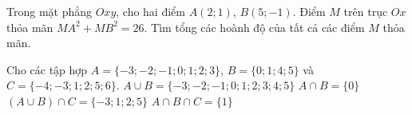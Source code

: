 \begin{bt}%
Trong mặt phẳng $Oxy$, cho hai điểm $A(2;1)$, $B(5;-1)$. Điểm $M$ trên trục $Ox$ thỏa mãn $MA^2+MB^2=26$. Tìm tổng các hoành độ của tất cả các điểm $M$ thỏa mãn.

\end{bt}

\begin{ex}%
	Cho các tập hợp $A=\{-3;-2;-1; 0; 1; 2;  3\}$, $B=\{0; 1; 4; 5\}$ và $C=\{-4;-3; 1; 2; 5; 6\}$.
	 \choiceTF
		 {\True $A\cup B=\{-3;-2;-1; 0; 1; 2; 3; 4; 5\}$}
		{$A\cap  B=\{0\}$}
		{\True  $(A\cup B)\cap C=\{-3; 1; 2; 5\}$}
		{\True $A\cap B\cap  C=\{1\}$}
\end{ex}

